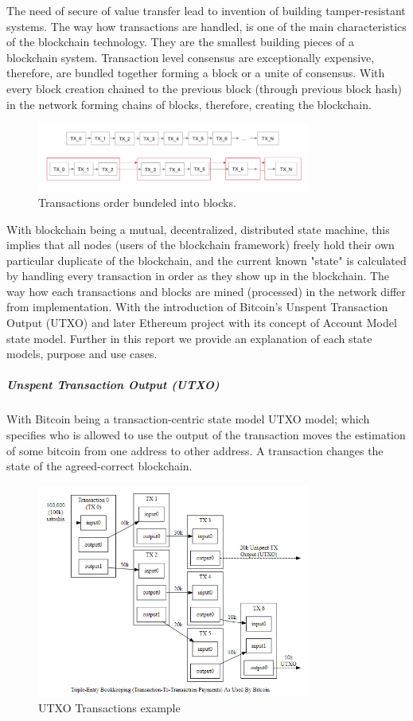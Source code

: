 The need of secure of value transfer lead to invention of building tamper-resistant systems. The way how transactions are handled, is one of the main characteristics of the blockchain technology. They are the smallest building pieces of a blockchain system. Transaction level consensus are exceptionally expensive, therefore, are bundled together forming a block or a unite of consensus. With every block creation chained to the previous block (through previous block hash) in the network forming chains of blocks, therefore, creating the blockchain.


\begin{figure}[h]
\centering
\includegraphics[width=0.8\textwidth]{images/transactions_blocks.png}
\caption{\label{fig:Transactions}Transactions order bundeled into blocks.}
\end{figure}


With blockchain being a mutual, decentralized, distributed state machine, this implies that all nodes (users of the blockchain framework) freely hold their own particular duplicate of the blockchain, and the current known "state" is calculated by handling every transaction in order as they show up in the blockchain. The way how each transactions and blocks are mined (processed) in the network differ from implementation. With the introduction of Bitcoin’s Unspent Transaction Output (UTXO) and later Ethereum project with its concept of Account Model state model. Further in this report we provide an explanation of each state models, purpose and use cases.

\subparagraph{Unspent Transaction Output (UTXO)}

With Bitcoin being a transaction-centric state model UTXO model; which specifies who is allowed to use the output of the transaction moves the estimation of some bitcoin from one address to other address. A transaction changes the state of the agreed-correct blockchain.

\begin{figure}[h]
\centering
\includegraphics[width=0.8\textwidth]{images/UTXO.png}
\caption{\label{fig:UTXO}UTXO Transactions example}
\end{figure}

